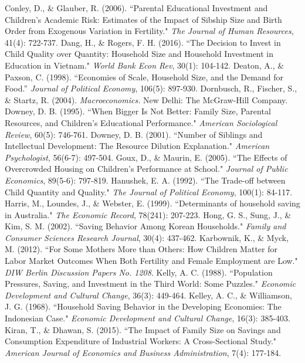 \documentclass[12pt]{extarticle}
\begin{document}
\begin{thebibliography}{50}
\bibitem{}
Conley, D., \& Glauber, R. (2006). ``Parental Educational Investment and Children’s Academic Risk: Estimates of the Impact of Sibship Size and Birth Order from Exogenous Variation in Fertility." \textit{The Journal of Human Resources}, 41(4): 722-737.
\bibitem{}
Dang, H., \& Rogers, F. H. (2016). ``The Decision to Invest in Child Quality over Quantity: Household Size and Household Investment in Education in Vietnam." \textit{World Bank Econ Rev}, 30(1): 104-142.
\bibitem{}
Deaton, A., \& Paxson, C. (1998). ``Economies of Scale, Household Size, and the Demand for Food.” \textit{Journal of Political Economy}, 106(5): 897-930. 
\bibitem{}
Dornbusch, R., Fischer, S., \& Startz, R. (2004). \textit{Macroeconomics.} New Delhi: The McGraw-Hill Company. 
\bibitem{}
Downey, D. B. (1995). ``When Bigger Is Not Better: Family Size, Parental Resources, and Children’s Educational Performance." \textit{American Sociological Review}, 60(5): 746-761.
\bibitem{}
Downey, D. B. (2001). ``Number of Siblings and Intellectual Development: The Resource Dilution Explanation." \textit{American Psychologist}, 56(6-7): 497-504.
\bibitem{}
Goux, D., \& Maurin, E. (2005). ``The Effects of Overcrowded Housing on Children’s Performance at School." \textit{Journal of Public Economics}, 89(5-6): 797-819.
\bibitem{}
Hanushek, E. A. (1992). ``The Trade-off between Child Quantity and Quality." \textit{The Journal of Political Economy}, 100(1): 84-117.
\bibitem{}
Harris, M., Loundes, J., \& Webster, E. (1999). ``Determinants of household saving in Australia." \textit{The Economic Record}, 78(241): 207-223.
\bibitem{}
Hong, G. S., Sung, J., \& Kim, S. M. (2002). ``Saving Behavior Among Korean Households." \textit{Family and Consumer Sciences Research Journal}, 30(4): 437-462.
\bibitem{}
Karbownik, K., \& Myck, M. (2012). ``For Some Mothers More than Others: How Children Matter for Labor Market Outcomes When Both Fertility and Female Employment are Low." \textit{DIW Berlin Discussion Papers No. 1208}.
\bibitem{}
Kelly, A. C. (1988). ``Population Pressures, Saving, and Investment in the Third World: Some Puzzles." \textit{Economic Development and Cultural Change}, 36(3): 449-464.
\bibitem{}
Kelley, A. C., \& Williamson, J. G. (1968). ``Household Saving Behavior in the Developing Economies: The Indonesian Case." \textit{Economic Development and Cultural Change}, 16(3): 385-403.
\bibitem{}
Kiran, T., \& Dhawan, S. (2015). ``The Impact of Family Size on Savings and Consumption Expenditure of Industrial Workers: A Cross-Sectional Study." \textit{American Journal of Economics and Business Administration}, 7(4):  177-184.

\end{thebibliography}
\end{document}
